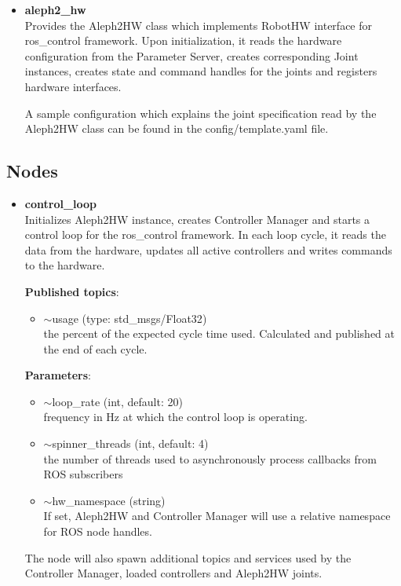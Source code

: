 \documentclass[english,inz,shortabstract]{iithesis}
\newcommand{\val}[1]{\textbf{\textsf{#1}}}
\begin{document}
\begin{itemize}
		\item \val{aleph2\_hw}\\
		Provides the \textsf{Aleph2HW} class which implements \textsf{RobotHW} interface for \textsf{ros\_control} framework. Upon initialization, it reads the hardware configuration from the Parameter Server, creates corresponding \textsf{Joint} instances, creates state and command handles for the joints and registers hardware interfaces.

		A sample configuration which explains the joint specification read by the \textsf{Aleph2HW} class can be found in the \textsf{config/template.yaml} file.

	\end{itemize}

\subsection{Nodes}

	\begin{itemize}
		\item \val{control\_loop}\\
		Initializes \textsf{Aleph2HW} instance, creates Controller Manager and starts a control loop for the \textsf{ros\_control} framework. In each loop cycle, it reads the data from the hardware, updates all active controllers and writes commands to the hardware.

		\textbf{Published topics}:
		\begin{itemize}[itemsep=0pt, parsep=2pt, topsep=0pt]
			\item \textsf{$\sim$usage} (type: \textsf{std\_msgs/Float32})\\
			the percent of the expected cycle time used. Calculated and published at the end of each cycle.
		\end{itemize}

		\textbf{Parameters}:
		\begin{itemize}[itemsep=0pt, parsep=2pt, topsep=0pt]
			\item \textsf{$\sim$loop\_rate} (\textsf{int}, default: \textsf{20})\\
			frequency in Hz at which the control loop is operating.
			\item \textsf{$\sim$spinner\_threads} (\textsf{int}, default: \textsf{4})\\
			the number of threads used to asynchronously process callbacks from ROS subscribers
			\item \textsf{$\sim$hw\_namespace} (\textsf{string})\\
			If set, Aleph2HW and Controller Manager will use a relative namespace for ROS node handles.
		\end{itemize}

		The node will also spawn additional topics and services used by the Controller Manager, loaded controllers and \textsf{Aleph2HW} joints.
	\end{itemize}
\end{document}
